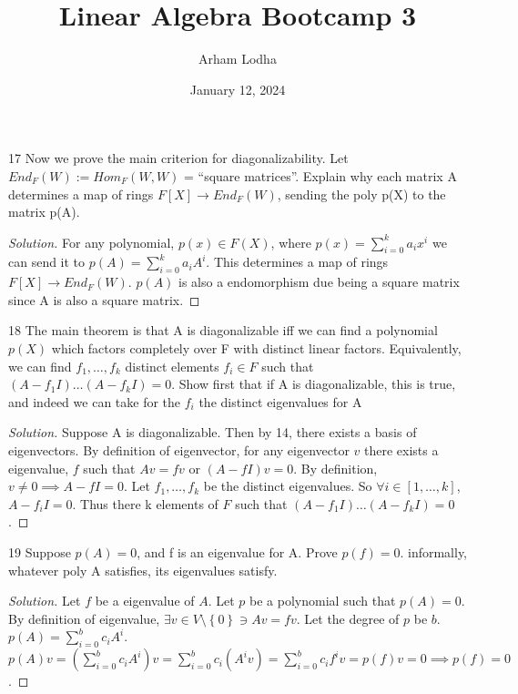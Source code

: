 \documentclass{article}
\newenvironment{solution}
{\renewcommand\qedsymbol{$\blacksquare$}\begin{proof}[Solution]}
{\end{proof}}
\begin{document}
\title{Linear Algebra Bootcamp 3}
\author{Arham Lodha}%
\date{January 12, 2024}%
\maketitle

\begin{PROB}{17}\label{Problem 17.}
    Now we prove the main criterion for diagonalizability. Let $End_F(W) := Hom_F(W,W)$ = “square matrices”.  Explain why each matrix A determines a map of rings $F[X] \to End_F(W)$, sending the poly p(X) to the matrix p(A). 
\end{PROB}
\begin{solution}
    For any polynomial, $p(x) \in F(X)$, where $p(x) = \sum_{i=0}^{k} a_ix^i$ we can send it to $p(A) = \sum_{i=0}^{k} a_iA^i$. This determines a map of rings $F[X] \to End_F(W)$. $p(A)$ is also a endomorphism due being a square matrix since A is also a square matrix.    
\end{solution}

\bigskip

\begin{PROB}{18}\label{Problem 18.}
    The main theorem is that A is diagonalizable iff we can find a polynomial $p(X)$ which factors completely over F with distinct linear factors. Equivalently, we can find $f_1, \dots ,f_k$ distinct elements $f_i \in F$ such that $(A - f_1 I) \dots (A - f_k I) = 0$.  Show first that if A is diagonalizable, this is true, and indeed we can take for the $f_i$ the distinct eigenvalues for A
\end{PROB}
\begin{solution}
    Suppose A is diagonalizable. Then by 14, there exists a basis of eigenvectors. By definition of eigenvector, for any eigenvector $v$ there exists a eigenvalue, $f$ such that $Av = fv$ or $(A - fI)v= 0 $. By definition, $v \neq 0 \implies A - fI = 0$. Let $f_1, \dots, f_k$ be the distinct eigenvalues. So $\forall i \in [1, \dots, k]$, $A - f_iI = 0$. Thus there k elements of $F$ such that $(A - f_1I)\dots(A - f_kI) = 0$.   
\end{solution}

\bigskip

\begin{PROB}{19}\label{Problem 19.}
    Suppose $p(A) = 0$, and f is an eigenvalue for A. Prove $p(f)=0$. informally, whatever poly A satisfies, its eigenvalues satisfy.
\end{PROB}
\begin{solution}
    Let $f$ be a eigenvalue of $A$. Let $p$ be a polynomial such that $p(A) = 0$. By definition of eigenvalue, $\exists v \in V \setminus \left\{0\right\} \ni Av = fv$. Let the degree of $p$ be $b$. $p(A) = \sum_{i=0}^{b} c_iA^i$. $p(A)v = \left(\sum_{i=0}^{b} c_iA^i\right)v = \sum_{i=0}^{b} c_i(A^iv) = \sum_{i=0}^{b} c_if^i v = p(f)v = 0 \implies p(f) = 0$.      
\end{solution}
\end{document}
